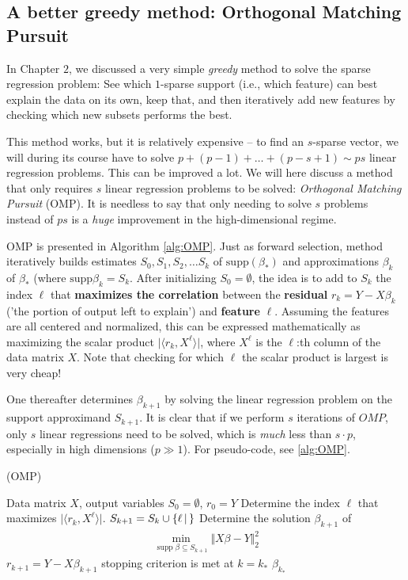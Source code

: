 \documentclass{article}
\DeclareMathOperator{\supp}{\mathrm{supp}}
\newcommand{\sprod}[1]{\langle #1 \rangle}
\newcommand{\sse}{\subseteq}
\newcommand{\set}[2]{\{ #1 \, \vert \, #2\}}
\newcommand{\abs}[1]{\vert #1 \vert}
\newcommand{\norm}[1]{\Vert #1 \Vert}
\begin{document}
\subsection{A better greedy method: Orthogonal Matching Pursuit}
In Chapter $2$, we discussed a very simple \emph{greedy} method to solve the sparse regression problem: See which $1$-sparse support (i.e., which feature) can best explain the data on its own, keep that, and then iteratively add new features by checking which new subsets performs the best.

This method works, but it is relatively expensive -- to find an $s$-sparse vector, we will during its course have to solve $p+(p-1)+\dots + (p-s+1) \sim ps$ linear regression problems. This can be improved a lot. We will here discuss a method that only requires $s$ linear regression problems to be solved: \emph{Orthogonal Matching Pursuit} (OMP). It is needless to say that only needing to solve $s$ problems instead of $ps$ is a \emph{huge} improvement in the high-dimensional regime.


OMP is presented in Algorithm \ref{alg:OMP}. Just as forward selection, method iteratively builds estimates $S_0,S_1,S_2, \dots S_k$ of $\mathrm{supp}(\beta_*)$ and approximations $\beta_k$ of $\beta_*$ (where $\mathrm{supp} \beta_k = S_k$. After initializing $S_0=\emptyset$, the idea is to add to $S_k$ the index  $\ell$ that \textbf{maximizes the correlation} between the \textbf{residual} $r_k=Y-X\beta_k$ ('the portion of output left to explain') and \textbf{feature} $\ell$. Assuming the features are all centered and normalized, this can be expressed mathematically as maximizing the scalar product $\abs{\sprod{r_k,X^\ell}}$, where $X^\ell$ is the $\ell$:th column of the data matrix $X$. Note that checking for which $\ell$ the scalar product is largest is very cheap!

One thereafter determines $\beta_{k+1}$ by solving the linear regression problem on the support approximand $S_{k+1}$. It is clear that if we perform $s$ iterations of $OMP$, only $s$ linear regressions need to be solved, which is \emph{much} less than $s\cdot p$, especially in high dimensions ($p\gg 1$). For pseudo-code, see \ref{alg:OMP}.


\begin{algorithm}[tb]      
	\caption{(OMP)} 
	\label{alg:OMP}
	\begin{algorithmic} [1]
 		\REQUIRE Data matrix $X$,  output variables
 		\STATE $S_0=\emptyset$, $r_0 = Y$
 		\REPEAT
 			\STATE Determine the index $\ell$ that maximizes $\abs{\sprod{r_k, X^\ell}}$.
            \STATE $S_{k+1} = S_k \cup \set{\ell}$
            \STATE Determine the solution $\beta_{k+1}$ of 
            \begin{align}
                \min_{\supp \beta \sse S_{k+1}} \norm{X\beta - Y}_2^2 \label{eq:ompprob}
            \end{align}
            \STATE $r_{k+1} = Y-X\beta_{k+1}$
 		\UNTIL stopping criterion is met at $k= k_*$
 		\RETURN $\beta_{k_*}$
	\end{algorithmic}
\end{algorithm}
\end{document}
